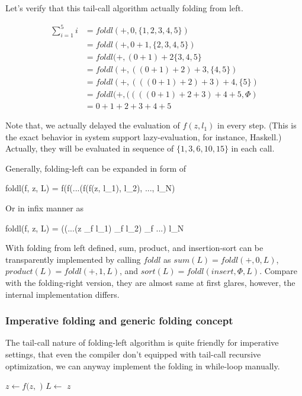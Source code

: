\documentclass{article}
\begin{document}
Let's verify that this tail-call algorithm actually folding from left. 

\[
\begin{array}{rl}
\sum_{i=1}^{5}i & = foldl(+, 0, \{1, 2, 3, 4, 5\}) \\
                & = foldl(+, 0 + 1, \{ 2, 3, 4, 5 \}) \\
                & = foldl(+, (0 + 1) + 2 \{3, 4, 5 \} \\
                & = foldl(+, ((0 + 1) + 2) + 3, \{4, 5\}) \\
                & = foldl(+, (((0 + 1) + 2) + 3) + 4, \{5\}) \\
                & = foldl(+, ((((0 + 1) + 2 + 3) + 4 + 5, \Phi) \\
                & = 0 + 1 + 2 + 3 + 4 + 5
\end{array}
\]

Note that, we actually delayed the evaluation of $f(z, l_1)$ in every step. (This is the exact behavior
in system support lazy-evaluation, for instance, Haskell.) Actually, they will be evaluated in sequence
of $\{ 1, 3, 6, 10, 15\}$ in each call.

Generally, folding-left can be expanded in form of

\be
foldl(f, z, L) = f(f(...(f(f(z, l_1), l_2), ..., l_N)
\ee

Or in infix manner as

\be
foldl(f, z, L) = ((...(z \oplus_f l_1) \oplus_f l_2) \oplus_f ...) \oplus l_N
\ee

With folding from left defined, sum, product, and insertion-sort can be transparently implemented by calling
$foldl$ as $sum(L) = foldl(+, 0, L)$, $product(L) = foldl(+, 1, L)$, and $sort(L) = foldl(insert, \Phi, L)$.
Compare with the folding-right version, they are almost same at first glares, however, the internal implementation
differs.

\subsubsection{Imperative folding and generic folding concept}
The tail-call nature of folding-left algorithm is quite friendly for imperative settings, that even the compiler
don't equipped with tail-call recursive optimization, we can anyway implement the folding in while-loop manually.

\begin{algorithmic}
    \State $z \gets f(z, $  $)$
    \State $L \gets$ 
  \EndWhile
  \State \Return $z$
\EndFunction
\end{algorithmic}
\end{document}
